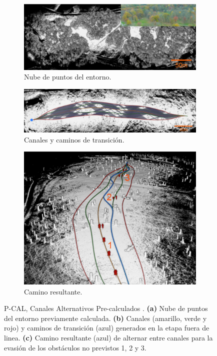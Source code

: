 \begin{figure}
    \centering
    \begin{subfigure}[b]{0.7\textwidth}
        \centering
        \includegraphics[width=\textwidth]{partes/img/P-CAL-map.png}
        \caption{Nube de puntos del entorno.}
    \end{subfigure}
    \hfill
    \begin{subfigure}[b]{0.7\textwidth}
        \centering
        \includegraphics[width=\textwidth]{partes/img/P-CAL-lanes.png}
        \caption{Canales y caminos de transición.}
    \end{subfigure}
    \break
    \begin{subfigure}[b]{0.5\textwidth}
        \centering
        \includegraphics[width=\textwidth]{partes/img/P-CAL-results.png}
        \caption{Camino resultante.}
    \end{subfigure}
    \hfill
    
    \caption [P-CAL: Canales Alternativos Pre-calculados]{P-CAL, Canales Alternativos Pre-calculados \cite{Zhang2019}. \textbf{(a)} Nube de puntos del entorno previamente calculada. \textbf{(b)} Canales (amarillo, verde y rojo) y caminos de transición (azul) generados en la etapa fuera de linea. \textbf{(c)} Camino resultante (azul) de alternar entre canales para la evasión de los obstáculos no previstos 1, 2 y 3.}
    \label{fig:P-CAL}
\end{figure}

